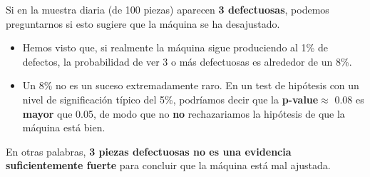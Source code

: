 \begin{enumerate}[label=\color{red}\textbf{\arabic*)}]
\begin{enumerate}[label=\arabic*)]
            Si en la muestra diaria (de 100 piezas) aparecen \textbf{3 defectuosas}, podemos preguntarnos si esto sugiere que la máquina se ha desajustado.
            \begin{itemize}[label=\textbullet]
                \item Hemos visto que, si realmente la máquina sigue produciendo al 1\% de defectos, la probabilidad de ver 3 o más defectuosas es alrededor de un 8\%.
                \item Un 8\% no es un suceso extremadamente raro. En un test de hipótesis con un nivel de significación típico del 5\%, podríamos decir que la \textbf{p-value}$\approx$ 0.08 es \textbf{mayor} que 0.05, de modo que no \textbf{no} rechazariamos la hipótesis de que la máquina está bien.  
            \end{itemize}
            En otras palabras, \textbf{3 piezas defectuosas no es una evidencia suficientemente fuerte} para concluir que la máquina está mal ajustada.  
    \end{enumerate}
\end{enumerate}
